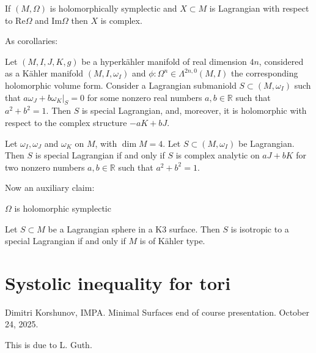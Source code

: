 \begin{lemma}[Hitchin]
\label{lemma-hitchin}
If $(M,\Omega)$ is holomorphically symplectic and $X \subset M$ 
is Lagrangian with respect to $\text{Re}\Omega$ and $\text{Im}\Omega$
then $X$ is complex.
\end{lemma}

\noindent
As corollaries:

\begin{lemma}
\label{lemma-corollary-hitchin}
Let $(M,I,J,K,g)$ be a hyperkähler manifold of real dimension $4n$,
considered as a Kähler manifold $(M,I,\omega_I)$ and $\phi:\Omega^n \in
\Lambda^{2n,0}(M,I)$ the corresponding holomorphic volume form.
Consider a Lagrangian submaniold $S \subset (M,\omega_I)$
such that $a \omega_J + b\omega_K|_S=0$ for some nonzero real numbers
$a,b \in \mathbb{R}$ such that $a^2+b^2=1$.
Then $S$ is special Lagrangian, and, moreover,
it is holomorphic with respect to the complex structure
$-a K+b J$.
\end{lemma}

\begin{lemma}
\label{lemma-corollary2-hitchin}
Let $\omega_I,\omega_J$ and $\omega_K$ on $M$, with $\dim M=4$.
Let $S \subset (M,\omega_I)$ be Lagrangian.
Then $S$ is special Lagrangian if and only if $S$ is complex analytic
on $a J + b K$ for two nonzero numbers  $a,b \in \mathbb{R}$ such that
$a^2+b^2=1$.
\end{lemma}

\noindent
Now an auxiliary claim:

\begin{lemma}
\label{lemma-k3-type}
$\Omega$ is holomorphic symplectic 
\end{lemma}

\begin{theorem}
\label{theorem-}
Let $S\subset M$ be a Lagrangian sphere in a K3 surface.
Then  $S$ is isotropic to a special Lagrangian if and only if
$M$ is of Kähler type.
\end{theorem}


\section{Systolic inequality for tori}
\label{section-systolic-inequality}

\noindent
Dimitri Korshunov, IMPA.
Minimal Surfaces end of course presentation. 
October 24, 2025.

\medskip\noindent
This is due to L. Guth.

